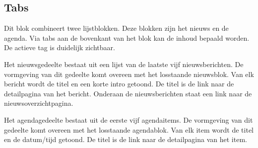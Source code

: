 \subsection{Tabs}
\label{sec:tabsmetnieuwsenagenda}
Dit blok combineert twee lijstblokken. Deze blokken zijn het nieuws en de agenda. Via tabs aan de bovenkant van het blok kan de inhoud bepaald worden. De actieve tag is duidelijk zichtbaar.

Het nieuwsgedeelte bestaat uit een lijst van de laatste vijf nieuwsberichten. De vormgeving van dit gedeelte komt overeen met het losstaande nieuwsblok. Van elk bericht wordt de titel en een korte intro getoond. De titel is de link naar de detailpagina van het bericht. Onderaan de nieuwsberichten staat een link naar de nieuwsoverzichtpagina. 

Het agendagedeelte  bestaat uit de eerste vijf agendaitems. De vormgeving van dit gedeelte komt overeen met het losstaande agendablok. Van elk item wordt de titel en de datum/tijd getoond. De titel is de link naar de detailpagina van het item.